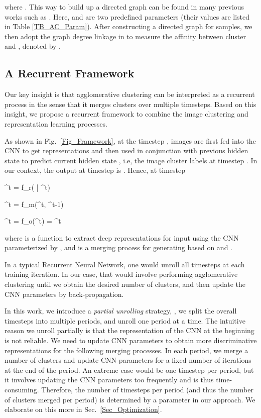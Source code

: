 \documentclass[10pt,twocolumn,letterpaper]{article}
\begin{document}
{{where . This way to build up a directed graph can be found in many previous works {such as} \cite{zhao2009cyclizing,zhang2012graph}. Here,  and  are two predefined parameters {(their values are listed in Table \ref{TB_AC_Param})}. After constructing a directed graph for samples, we then adopt the graph degree linkage in \cite{zhang2012graph} to measure the affinity {between cluster  and , denoted by .}

\subsection{A Recurrent Framework}
{Our key insight is that agglomerative} clustering can be interpreted as a recurrent process in {the} sense that it merges clusters over multiple timesteps. Based on this insight, we propose a recurrent framework to combine the image clustering and representation learning processes. 

As shown in Fig.~\ref{Fig_Framework}, at the timestep , images  are first fed into the CNN to get representations  and then used in conjunction with previous hidden state  to predict current hidden state , i.e, the image cluster labels at timestep . {In our context, the output at timestep  is }. {Hence, at timestep }

\small
{}^t = f_r( | \bm{\theta}^t)
\label{Eq_Recurrent_X}

\small
{}^t = f_m(^t, ^{t-1})
\label{Eq_Recurrent_h_t}

\small
{}^t = f_o(^t) = ^t
\label{Eq_Recurrent_y_t}

where  is a function to extract deep representations  for input  {using the CNN parameterized by }, and { is a merging process for generating  based on  and }. 

{In a typical Recurrent Neural Network, {one would unroll all timesteps at each training iteration}. {In our case, that would involve performing agglomerative clustering} until we obtain the desired number of clusters, and then update the CNN parameters by back-propagation.}

{In this work, we introduce a \emph{partial unrolling} strategy, \ie, we split the overall  timesteps into multiple periods, and unroll one period at a time. The intuitive reason we unroll partially is that the representation of the CNN at the beginning is not reliable. We need to update CNN parameters to obtain more discriminative representations for {the} following merging processes. In each period, we merge a number of clusters and update CNN parameters for a fixed number of iterations at the end of the period. An extreme case would be one timestep per period, but it involves updating the CNN parameters too frequently and is thus time-consuming. Therefore, the number of timesteps per period (and thus the number of clusters merged per period) is determined by a parameter in our approach. We elaborate on this more in Sec.~\ref{Sec_Optimization}}.

}}
\end{document}

